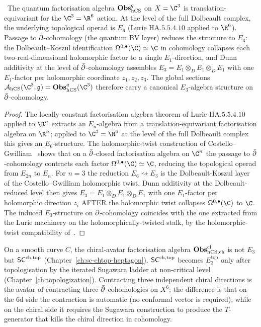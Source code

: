 \begin{theorem}
\label{thm:hcs-e3-from-translation}
%
\ClaimStatusProvedElsewhere\,\cite[Ch.\,5,\,\S5.2]{CostelloGwilliam2017}
The quantum factorisation algebra $\mathbf{Obs}^{q}_{\mathrm{hCS}}$ on $X = \C^3$ is
translation-equivariant for the $\C^3 = \R^6$ action. At the level of
the full Dolbeault complex, the underlying topological operad is
$E_6$ (Lurie $\mathrm{HA}.5.5.4.10$ applied to $\R^6$). Passage to
$\bar\partial$-cohomology (the quantum BV layer) reduces the structure to
$E_3$: the Dolbeault--Koszul identification
$\Omega^{0,\bullet}(\C)\simeq\C$ in cohomology collapses each
two-real-dimensional holomorphic factor to a single $E_1$-direction,
and Dunn additivity at the level of $\bar\partial$-cohomology assembles
$E_3 = E_1\otimes_D E_1\otimes_D E_1$ with one $E_1$-factor per
holomorphic coordinate $z_1,z_2,z_3$. The global sections
$\cA_{\hCS}(\C^3,\fg)=\Fobs^q_{\hCS}(\C^3)$ therefore carry a
canonical $E_3$-algebra structure on $\bar\partial$-cohomology.
\end{theorem}

\begin{proof}
The locally-constant factorisation algebra theorem of Lurie
$\mathrm{HA}.5.5.4.10$ applied to $\R^n$ extracts an $E_n$-algebra
from a translation-equivariant factorisation algebra on $\R^n$;
applied to $\C^3=\R^6$ at the level of the full Dolbeault complex
this gives an $E_6$-structure. The holomorphic-twist construction of
Costello--Gwilliam~\cite[\S5.2.1, Ch.\,5, Thm.\,5.1]{CostelloGwilliam2017}
shows that on a $\bar\partial$-closed factorisation algebra on $\C^n$ the
passage to $\bar\partial$-cohomology contracts each factor
$\Omega^{0,\bullet}(\C)\simeq\C$, reducing the topological operad
from $E_{2n}$ to $E_n$. For $n=3$ the reduction $E_6\rightsquigarrow E_3$
is the Dolbeault-Koszul layer of the Costello--Gwilliam holomorphic
twist. Dunn additivity at the Dolbeault-reduced level then gives
$E_3 = E_1\otimes_D E_1\otimes_D E_1$ with one $E_1$-factor per
holomorphic direction $z_i$ AFTER the holomorphic twist collapses
$\Omega^{0,\bullet}(\C)$ to $\C$. The induced $E_3$-structure
on $\bar\partial$-cohomology coincides with the one extracted from the
Lurie machinery on the holomorphically-twisted stalk, by the
holomorphic-twist compatibility
of~\cite[\S5.2.1, Ch.\,5]{CostelloGwilliam2017}.
\end{proof}

\begin{remark}
\label{rem:chiral-avatar-e3}
On a smooth curve $C$, the chiral-avatar factorisation algebra
$\mathbf{Obs}^{\mathrm{cl}}_{\mathrm{hCS},\mathrm{ch}}$ is not $E_3$ but
$\mathsf{SC}^{\mathrm{ch},\mathrm{top}}$ (Chapter~\ref{ch:sc-chtop-heptagon}).
$\mathsf{SC}^{\mathrm{ch},\mathrm{top}}$ becomes $E_3^{\mathrm{top}}$ only after topologisation by
the iterated Sugawara ladder at non-critical level
(Chapter~\ref{ch:topologization}). Contracting three
independent chiral directions is the avatar of contracting
three $\bar\partial$-cohomologies on $X^6$; the difference is that on the
6d side the contraction is automatic (no conformal vector is
required), while on the chiral side it requires the
Sugawara construction to produce the $T$-generator that kills the
chiral direction in cohomology.
\end{remark}

